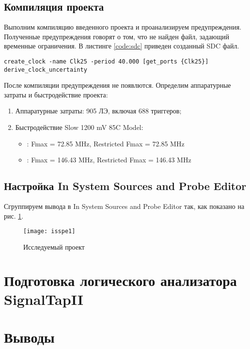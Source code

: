 \subsection{Компиляция проекта}

Выполним компиляцию введенного проекта и проанализируем предупреждения. Полученные предупреждения говорят о том, что не найден файл, задающий временные ограничения. В листинге \ref{code:sdc} приведен созданный SDC файл.

\begin{lstlisting}[caption=Synopsys Design Constraints (SDC) файл, label=code:sdc]
create_clock -name Clk25 -period 40.000 [get_ports {Clk25}]
derive_clock_uncertainty
\end{lstlisting}

После компиляции предупреждения не появлются. Определим аппаратурные затраты и быстродействие проекта:

\begin{enumerate}
	\item Аппаратурные затраты: 905 ЛЭ, включая 688 триггеров;
	\item Быстродействие Slow 1200 mV 85C Model:
		\begin{itemize}[leftmargin=*]
			\item {}: Fmax = 72.85 MHz, Restricted Fmax = 72.85 MHz
			\item {}: Fmax = 146.43 MHz, Restricted Fmax = 146.43 MHz
		\end{itemize}
\end{enumerate}

\subsection{Настройка In System Sources and Probe Editor}

Сгруппируем вывода в In System Sources and Probe Editor так, как показано на рис. \ref{fig:isspe1}.

\vspace{-0.5cm}
\begin{figure}[H]
	\begin{center}
		\texttt{[image: isspe1]}
		\caption{Исследуемый проект}
		\label{fig:isspe1}
	\end{center}
\end{figure}
\vspace{-0.5cm}

\section{Подготовка логического анализатора SignalTapII}

\section{Выводы}



